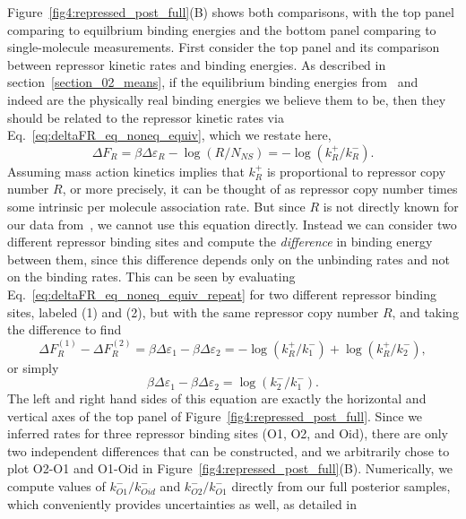 Figure~\ref{fig4:repressed_post_full}(B) shows both comparisons,
with the top panel comparing to equilbrium binding energies
and the bottom panel comparing to single-molecule measurements.
First consider the top panel and its comparison between repressor
kinetic rates and binding energies.
As described in section~\ref{section_02_means}, if the
equilibrium binding energies from~\cite{Garcia2011a}
and~\cite{Razo-Mejia2018} indeed are the physically real binding
energies we believe them to be, then they should be related to
the repressor kinetic rates via
Eq.~\ref{eq:deltaFR_eq_noneq_equiv}, which we restate here,
\begin{equation}
\Delta F_R = \beta\Delta\varepsilon_R - \log(R/N_{NS})
        = - \log(k_R^+/k_R^-).
\label{eq:deltaFR_eq_noneq_equiv_repeat}
\end{equation}
Assuming mass action
kinetics implies that $k_R^+$ is proportional to repressor copy
number $R$, or more precisely, it can be thought of as repressor
copy number times some intrinsic per molecule association rate.
But since $R$ is not directly known for our data
from~\cite{Jones2014}, we cannot use this equation directly.
Instead we can consider two different repressor binding sites and
compute the \textit{difference} in binding energy between them,
since this difference depends only on the unbinding rates and not
on the binding rates. This can be seen by evaluating
Eq.~\ref{eq:deltaFR_eq_noneq_equiv_repeat} for two different
repressor binding sites, labeled (1) and (2), but with the same
repressor copy number $R$, and taking the difference to find
\begin{equation}
\Delta F_R^{(1)} - \Delta F_R^{(2)}
= \beta\Delta\varepsilon_1 - \beta\Delta\varepsilon_2
= - \log(k_R^+/k_1^-) + \log(k_R^+/k_2^-),
\end{equation}
or simply
\begin{equation}
\beta\Delta\varepsilon_1 - \beta\Delta\varepsilon_2
= \log(k_2^-/k_1^-).
\end{equation}
The left and right hand sides of this equation are exactly the horizontal
and vertical axes of the top panel of Figure~\ref{fig4:repressed_post_full}.
Since we inferred rates for three repressor binding sites (O1, O2, and Oid),
there are only two independent differences that can be constructed, and we
arbitrarily chose to plot O2-O1 and O1-Oid in
Figure~\ref{fig4:repressed_post_full}(B).
Numerically, we compute values of $k_{O1}^- / k_{Oid}^-$ and
$k_{O2}^- / k_{O1}^-$ directly from our full posterior samples,
which conveniently provides uncertainties as well, as detailed in
